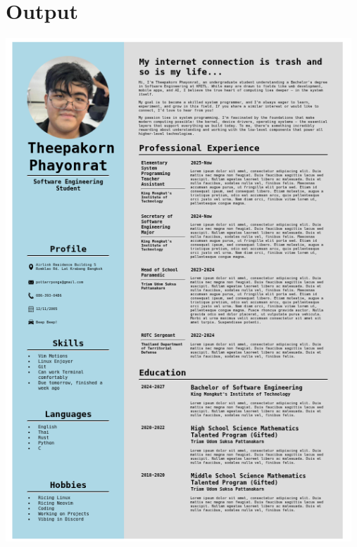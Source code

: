\documentclass[12pt]{report} %
\begin{document}
\newpage

\section*{Output}


	  \includegraphics[width=13cm]{../Output.png} %
\end{document}
